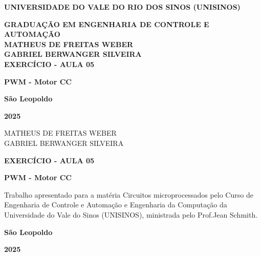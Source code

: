 \documentclass[12pt, a4paper]{article}
\date{\today}
\newcommand\studentName{Matheus de Freitas Weber}
\newcommand\studentTwoName{Gabriel Berwanger Silveira}
\newcommand\courseName{Circuitos microprocessados}
\newcommand\titleName{Exercício - Aula 05}
\newcommand\subTitleName{PWM - Motor CC}
\newcommand\teacherName{Jean Schmith}
\begin{document}
\begin{center}
	\MakeUppercase{\textbf{Universidade do Vale do Rio dos Sinos (Unisinos)}}

	\MakeUppercase{\textbf{Graduação em Engenharia de controle e automação}} \\[16ex]


	\MakeUppercase{\textbf{\studentName}}
	\\
	\MakeUppercase{\textbf{\studentTwoName}}
	\\[16ex]

	\MakeUppercase{\textbf{\titleName}}

	\textbf{\subTitleName}

	\vfill

	\textbf{São Leopoldo}

	\textbf{2025}

	\thispagestyle{empty}
\end{center}
\newpage

\begin{center}
	\vspace*{28ex}
	\MakeUppercase{\studentName}
	\\
	\MakeUppercase{\studentTwoName}
	\vspace*{16ex}

	\MakeUppercase{\textbf{\titleName}}

	\textbf{\subTitleName}

	\vspace*{8ex}

	\hfill\begin{minipage}{0.5\linewidth}
		Trabalho apresentado para a matéria {\courseName} pelo Curso de Engenharia de Controle e Automação e Engenharia da Computação da Universidade do Vale do Sinos (UNISINOS), ministrada pelo Prof.\teacherName.
	\end{minipage}
	\vfill

	\textbf{São Leopoldo}

	\textbf{2025}

\end{center}
\thispagestyle{empty}
\setcounter{page}{1}

\newpage
\begin{center}
	\tableofcontents
\end{center}
\thispagestyle{empty}

\newpage
\end{document}
